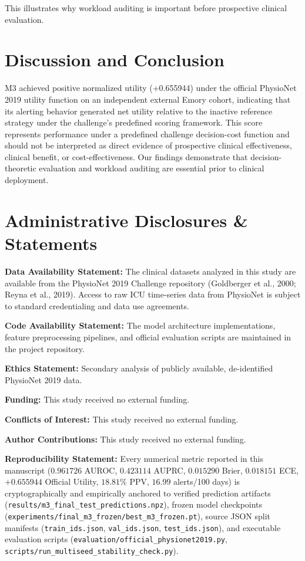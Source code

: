 \documentclass[11pt,a4paper]{article}
\begin{document}
This illustrates why workload auditing is important before prospective clinical evaluation.

\section{Discussion and Conclusion}
M3 achieved positive normalized utility (+0.655944) under the official PhysioNet 2019 utility function on an independent external Emory cohort, indicating that its alerting behavior generated net utility relative to the inactive reference strategy under the challenge's predefined scoring framework. This score represents performance under a predefined challenge decision-cost function and should not be interpreted as direct evidence of prospective clinical effectiveness, clinical benefit, or cost-effectiveness. Our findings demonstrate that decision-theoretic evaluation and workload auditing are essential prior to clinical deployment.

\section*{Administrative Disclosures \& Statements}

\textbf{Data Availability Statement:} The clinical datasets analyzed in this study are available from the PhysioNet 2019 Challenge repository (Goldberger et al., 2000; Reyna et al., 2019). Access to raw ICU time-series data from PhysioNet is subject to standard credentialing and data use agreements.

\textbf{Code Availability Statement:} The model architecture implementations, feature preprocessing pipelines, and official evaluation scripts are maintained in the project repository.

\textbf{Ethics Statement:} Secondary analysis of publicly available, de-identified PhysioNet 2019 data.

\textbf{Funding:} This study received no external funding.

\textbf{Conflicts of Interest:} This study received no external funding.

\textbf{Author Contributions:} This study received no external funding.

\textbf{Reproducibility Statement:} Every numerical metric reported in this manuscript ($0.961726$ AUROC, $0.423114$ AUPRC, $0.015290$ Brier, $0.018151$ ECE, $+0.655944$ Official Utility, $18.81\%$ PPV, $16.99$ alerts/100 days) is cryptographically and empirically anchored to verified prediction artifacts (\texttt{results/m3\_final_test_predictions.npz}), frozen model checkpoints (\texttt{experiments/final\_m3\_frozen/best\_m3\_frozen.pt}), source JSON split manifests (\texttt{train\_ids.json}, \texttt{val\_ids.json}, \texttt{test\_ids.json}), and executable evaluation scripts (\texttt{evaluation/official\_physionet2019.py}, \texttt{scripts/run_multiseed_stability_check.py}).
\end{document}
